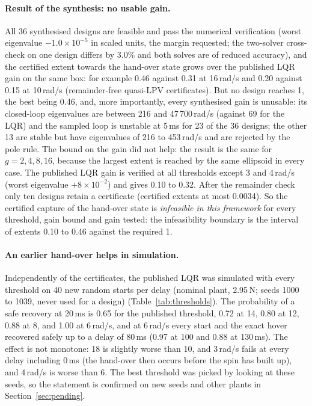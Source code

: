 \paragraph{Result of the synthesis: no usable gain.} All 36 synthesised designs are feasible and pass the numerical verification (worst eigenvalue $-1.0\times10^{-5}$ in scaled units, the margin requested; the two-solver cross-check on one design differs by 3.0\% and both solves are of reduced accuracy), and the certified extent towards the hand-over state grows over the published LQR gain on the same box: for example 0.46 against 0.31 at 16\,rad/s and 0.20 against 0.15 at 10\,rad/s (remainder-free quasi-LPV certificates). But no design reaches 1, the best being 0.46, and, more importantly, every synthesised gain is unusable: its closed-loop eigenvalues are between 216 and 47\,700\,rad/s (against 69 for the LQR) and the sampled loop is unstable at 5\,ms for 23 of the 36 designs; the other 13 are stable but have eigenvalues of 216 to 453\,rad/s and are rejected by the pole rule. The bound on the gain did not help: the result is the same for $g=2,4,8,16$, because the largest extent is reached by the same ellipsoid in every case. The published LQR gain is verified at all thresholds except 3 and 4\,rad/s (worst eigenvalue $+8\times10^{-2}$) and gives 0.10 to 0.32. After the remainder check only ten designs retain a certificate (certified extents at most 0.0034). So the certified capture of the hand-over state is \emph{infeasible in this framework} for every threshold, gain bound and gain tested: the infeasibility boundary is the interval of extents 0.10 to 0.46 against the required 1.

\paragraph{An earlier hand-over helps in simulation.} Independently of the certificates, the published LQR was simulated with every threshold on 40 new random starts per delay (nominal plant, 2.95\,N; seeds 1000 to 1039, never used for a design) (Table~\ref{tab:thresholds}). The probability of a safe recovery at 20\,ms is 0.65 for the published threshold, 0.72 at 14, 0.80 at 12, 0.88 at 8, and 1.00 at 6\,rad/s, and at 6\,rad/s every start and the exact hover recovered safely up to a delay of 80\,ms (0.97 at 100 and 0.88 at 130\,ms). The effect is not monotone: 18 is slightly worse than 10, and 3\,rad/s fails at every delay including 0\,ms (the hand-over then occurs before the spin has built up), and 4\,rad/s is worse than 6. The best threshold was picked by looking at these seeds, so the statement is confirmed on new seeds and other plants in Section~\ref{sec:pending}.

